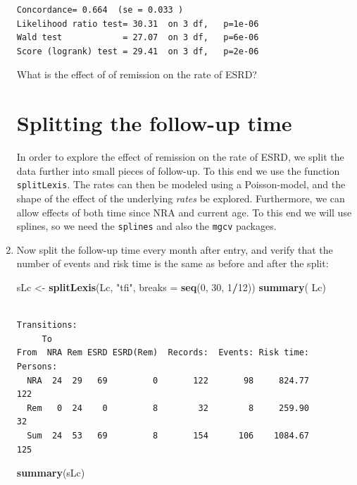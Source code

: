 \documentclass[
]{book}
\newenvironment{Shaded}{\begin{snugshade}}{\end{snugshade}}
\newcommand{\AttributeTok}[1]{\textcolor[rgb]{0.13,0.29,0.53}{#1}}
\newcommand{\DecValTok}[1]{\textcolor[rgb]{0.00,0.00,0.81}{#1}}
\newcommand{\FunctionTok}[1]{\textcolor[rgb]{0.13,0.29,0.53}{\textbf{#1}}}
\newcommand{\NormalTok}[1]{#1}
\newcommand{\OtherTok}[1]{\textcolor[rgb]{0.56,0.35,0.01}{#1}}
\newcommand{\SpecialCharTok}[1]{\textcolor[rgb]{0.81,0.36,0.00}{\textbf{#1}}}
\newcommand{\StringTok}[1]{\textcolor[rgb]{0.31,0.60,0.02}{#1}}
\begin{document}
\begin{enumerate}
\begin{verbatim}
Concordance= 0.664  (se = 0.033 )
Likelihood ratio test= 30.31  on 3 df,   p=1e-06
Wald test            = 27.07  on 3 df,   p=6e-06
Score (logrank) test = 29.41  on 3 df,   p=2e-06
\end{verbatim}

  What is the effect of of remission on the rate of ESRD?

  \section{Splitting the follow-up time}\label{splitting-the-follow-up-time}

  In order to explore the effect of remission on the rate of ESRD, we
  split the data further into small pieces of follow-up. To this
  end we use the function \texttt{splitLexis}. The rates can then be
  modeled using a Poisson-model, and the shape of the effect of the
  underlying \emph{rates} be explored. Furthermore, we can allow effects of both
  time since NRA and current age. To this end we will use splines, so we
  need the \texttt{splines} and also the \texttt{mgcv} packages.
\item
  Now split the follow-up time every month after entry, and verify
  that the number of events and risk time is the same as before and
  after the split:

\begin{Shaded}
\begin{Highlighting}[]
\NormalTok{sLc }\OtherTok{\textless{}{-}} \FunctionTok{splitLexis}\NormalTok{(Lc, }\StringTok{"tfi"}\NormalTok{, }\AttributeTok{breaks =} \FunctionTok{seq}\NormalTok{(}\DecValTok{0}\NormalTok{, }\DecValTok{30}\NormalTok{, }\DecValTok{1}\SpecialCharTok{/}\DecValTok{12}\NormalTok{))}
\FunctionTok{summary}\NormalTok{( Lc)}
\end{Highlighting}
\end{Shaded}

\begin{verbatim}

Transitions:
     To
From  NRA Rem ESRD ESRD(Rem)  Records:  Events: Risk time:  Persons:
  NRA  24  29   69         0       122       98     824.77       122
  Rem   0  24    0         8        32        8     259.90        32
  Sum  24  53   69         8       154      106    1084.67       125
\end{verbatim}

\begin{Shaded}
\begin{Highlighting}[]
\FunctionTok{summary}\NormalTok{(sLc)}
\end{Highlighting}
\end{Shaded}


\end{enumerate}
\end{document}
